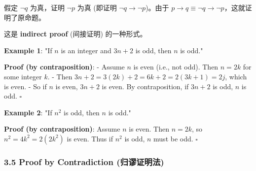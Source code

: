 \documentclass[10pt,a4paper,openany]{ctexbook}
\theoremstyle{definition}
\theoremstyle{remark}
\renewenvironment{quote}
  {\list{}{\leftmargin=1em\rightmargin=0pt\topsep=0.5pt\partopsep=0pt}\item[]}
  {\endlist}
\begin{document}
\begin{quote}
假定 $\neg q$ 为真，证明 $\neg p$ 为真 (即证明 $\neg q \to \neg p$)。由于 $p \to q \equiv \neg q \to \neg p$，这就证明了原命题。

这是 \textbf{indirect proof} (间接证明) 的一种形式。

\textbf{Example 1}: "If $n$ is an integer and $3n + 2$ is odd, then $n$ is odd."

\textbf{Proof (by contraposition)}:
- Assume $n$ is even (i.e., not odd). Then $n = 2k$ for some integer $k$.
- Then $3n + 2 = 3(2k) + 2 = 6k + 2 = 2(3k + 1) = 2j$, which is even.
- So if $n$ is even, $3n+2$ is even. By contraposition, if $3n+2$ is odd, $n$ is odd. $\square$

\textbf{Example 2}: "If $n^2$ is odd, then $n$ is odd."

\textbf{Proof (by contraposition)}: Assume $n$ is even. Then $n = 2k$, so $n^2 = 4k^2 = 2(2k^2)$ is even. Thus if $n^2$ is odd, $n$ must be odd. $\square$

\end{quote}
\vspace{-2pt}

\subsubsection{3.5 Proof by Contradiction (归谬证明法)}
\end{document}
